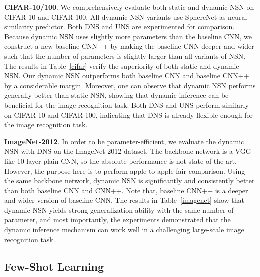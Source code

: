 \textbf{CIFAR-10/100}. We comprehensively evaluate both static and dynamic NSN on CIFAR-10 and CIFAR-100. All dynamic NSN variants use SphereNet as neural similarity predictor. Both DNS and UNS are experimented for comparison. Because dynamic NSN uses slightly more parameters than the baseline CNN, we construct a new baseline CNN++ by making the baseline CNN deeper and wider such that the number of parameters is slightly larger than all variants of NSN. The results in Table~\ref{cifar} verify the superiority of both static and dynamic NSN. Our dynamic NSN outperforms both baseline CNN and baseline CNN++ by a considerable margin. Moreover, one can observe that dynamic NSN performs generally better than static NSN, showing that dynamic inference can be beneficial for the image recognition task. Both DNS and UNS perform similarly on CIFAR-10 and CIFAR-100, indicating that DNS is already flexible enough for the image recognition task.

\textbf{ImageNet-2012}. In order to be parameter-efficient, we evaluate the dynamic NSN with DNS on the ImageNet-2012 dataset. The backbone network is a VGG-like 10-layer plain CNN, so the absolute performance is not state-of-the-art. However, the purpose here is to perform apple-to-apple fair comparison. Using the same backbone network, dynamic NSN is significantly and consistently better than both baseline CNN and CNN++. Note that, baseline CNN++ is a deeper and wider version of baseline CNN. The results in Table~\ref{imagenet} show that dynamic NSN yields strong generalization ability with the same number of parameter, and most importantly, the experiments demonstrated that the dynamic inference mechanism can work well in a challenging large-scale image recognition task.

\subsection{Few-Shot Learning}

